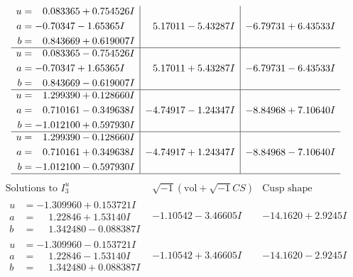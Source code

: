 \documentclass[1p]{elsarticle_modified}
\theoremstyle{definition}
\newcommand{\I}{\sqrt{-1}}
\begin{document}
$$\begin{array}{c|c|c}
\begin{aligned}
u &= \phantom{-}0.083365 + 0.754526 I \\
a &= -0.70347 - 1.65365 I \\
b &= \phantom{-}0.843669 + 0.619007 I\end{aligned}
 & \phantom{-}5.17011 - 5.43287 I & -6.79731 + 6.43533 I \\ \hline\begin{aligned}
u &= \phantom{-}0.083365 - 0.754526 I \\
a &= -0.70347 + 1.65365 I \\
b &= \phantom{-}0.843669 - 0.619007 I\end{aligned}
 & \phantom{-}5.17011 + 5.43287 I & -6.79731 - 6.43533 I \\ \hline\begin{aligned}
u &= \phantom{-}1.299390 + 0.128660 I \\
a &= \phantom{-}0.710161 - 0.349638 I \\
b &= -1.012100 + 0.597930 I\end{aligned}
 & -4.74917 - 1.24347 I & -8.84968 + 7.10640 I \\ \hline\begin{aligned}
u &= \phantom{-}1.299390 - 0.128660 I \\
a &= \phantom{-}0.710161 + 0.349638 I \\
b &= -1.012100 - 0.597930 I\end{aligned}
 & -4.74917 + 1.24347 I & -8.84968 - 7.10640 I\\
 \hline 
 \end{array}$$\newpage$$\begin{array}{c|c|c}  
\text{Solutions to }I^u_{3}& \I (\text{vol} + \sqrt{-1}CS) & \text{Cusp shape}\\
 \hline 
\begin{aligned}
u &= -1.309960 + 0.153721 I \\
a &= \phantom{-}1.22846 + 1.53140 I \\
b &= \phantom{-}1.342480 - 0.088387 I\end{aligned}
 & -1.10542 - 3.46605 I & -14.1620 + 2.9245 I \\ \hline\begin{aligned}
u &= -1.309960 - 0.153721 I \\
a &= \phantom{-}1.22846 - 1.53140 I \\
b &= \phantom{-}1.342480 + 0.088387 I\end{aligned}
 & -1.10542 + 3.46605 I & -14.1620 - 2.9245 I \\ \hline\begin{aligned}

\end{aligned}
\end{array}$$
\end{document}
